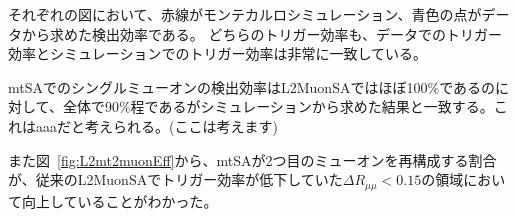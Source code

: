 それぞれの図において、赤線がモンテカルロシミュレーション、青色の点がデータから求めた検出効率である。
どちらのトリガー効率も、データでのトリガー効率とシミュレーションでのトリガー効率は非常に一致している。

mtSAでのシングルミューオンの検出効率はL2MuonSAではほぼ100$\%$であるのに対して、全体で90$\%$程であるがシミュレーションから求めた結果と一致する。これはaaaだと考えられる。(ここは考えます)

また図~\ref{fig:L2mt2muonEff}から、mtSAが2つ目のミューオンを再構成する割合が、従来のL2MuonSAでトリガー効率が低下していた$\Delta R_{\mu\mu}<0.15$の領域において向上していることがわかった。
